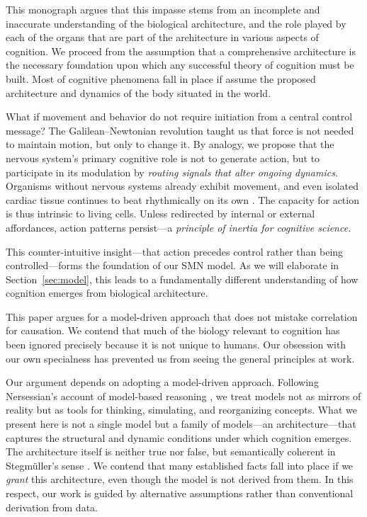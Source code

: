 This monograph argues that this impasse stems from an incomplete and inaccurate understanding of the biological architecture, and the role played by each of the organs that are part of the architecture in various aspects of cognition. We proceed from the assumption that a comprehensive architecture is the necessary foundation upon which any successful theory of cognition must be built. Most of cognitive phenomena fall in place if assume the proposed architecture and dynamics of the body situated in the world. 

What if movement and behavior do not require initiation from a central control message? The Galilean–Newtonian revolution taught us that force is not needed to maintain motion, but only to change it. By analogy, we propose that the nervous system’s primary cognitive role is not to generate action, but to participate in its modulation by \emph{routing signals that alter ongoing dynamics}. Organisms without nervous systems already exhibit movement, and even isolated cardiac tissue continues to beat rhythmically on its own \citep{llinas2002vortex, landecker2007culturing}. The capacity for action is thus intrinsic to living cells. Unless redirected by internal or external affordances, action patterns persist—a \emph{principle of inertia for cognitive science}. 

This counter-intuitive insight—that action precedes control rather than being controlled—forms the foundation of our SMN model. As we will elaborate in Section~\ref{sec:model}, this leads to a fundamentally different understanding of how cognition emerges from biological architecture.

This paper argues for a model-driven approach that does not mistake correlation for causation. We contend that much of the biology relevant to cognition has been ignored precisely because it is not unique to humans. Our obsession with our own specialness has prevented us from seeing the general principles at work.

Our argument depends on adopting a model-driven approach. Following Nersessian’s account of model-based reasoning \citep{Nersessian1999_ModelBasedReasoning}, we treat models not as mirrors of reality but as tools for thinking, simulating, and reorganizing concepts. What we present here is not a single model but a family of models—an architecture—that captures the structural and dynamic conditions under which cognition emerges. The architecture itself is neither true nor false, but semantically coherent in Stegmüller’s sense \citep{Stegmueller1976_StructureDynamics}. We contend that many established facts fall into place if we \emph{grant} this architecture, even though the model is not derived from them. In this respect, our work is guided by alternative assumptions rather than conventional derivation from data.

